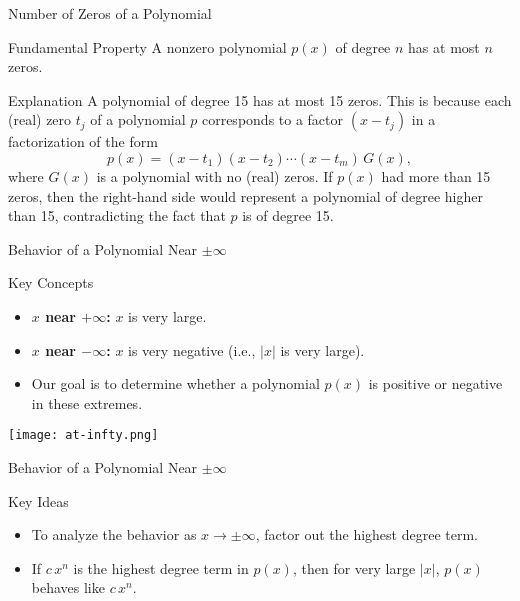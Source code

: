 \begin{frame}{Number of Zeros of a Polynomial}
  \begin{block}{Fundamental Property}
    A nonzero polynomial \(p(x)\) of degree \(n\) has at most \(n\) zeros.
  \end{block}

  \begin{block}{Explanation}
    A polynomial of degree 15 has at most 15 zeros. This is because each (real) zero \(t_j\) of a polynomial \(p\) corresponds to a factor \((x-t_j)\) in a factorization of the form
    \[
      p(x) = (x-t_1)(x-t_2)\cdots(x-t_m) \, G(x),
    \]
    where \(G(x)\) is a polynomial with no (real) zeros. If \(p(x)\) had more than 15 zeros, then the right-hand side would represent a polynomial of degree higher than 15, contradicting the fact that \(p\) is of degree 15.
  \end{block}
\end{frame}


\begin{frame}{Behavior of a Polynomial Near \(\pm\infty\)}
  \begin{block}{Key Concepts}
    \begin{itemize}
      \item \textbf{\(x\) near \(+\infty\):} \(x\) is very large.
      \item \textbf{\(x\) near \(-\infty\):} \(x\) is very negative (i.e., \(|x|\) is very large).
      \item Our goal is to determine whether a polynomial \(p(x)\) is positive or negative in these extremes.
    \end{itemize}
  \end{block}
\end{frame}

\begin{frame}
  \centering
  \texttt{[image: at-infty.png]}


\end{frame}
 

\begin{frame}{Behavior of a Polynomial Near \(\pm\infty\)}
  \begin{block}{Key Ideas}
    \begin{itemize}
      \item To analyze the behavior as \(x\to\pm\infty\), factor out the highest degree term.
      \item If \(c\,x^n\) is the highest degree term in \(p(x)\), then for very large \(|x|\), \(p(x)\) behaves like \(c\,x^n\).
    \end{itemize}
  \end{block}
\end{frame}
   

